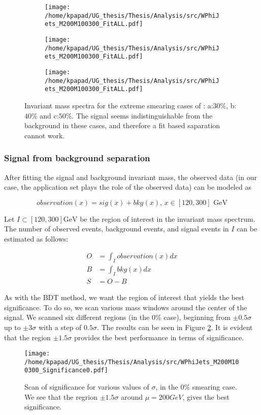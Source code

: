 \begin{figure}[htbp]
\centering
\begin{subfigure}{0.45\textwidth}
\centering
\texttt{[image: /home/kpapad/UG\_thesis/Thesis/Analysis/src/WPhiJets\_M200M100300\_FitALL.pdf]}
\caption{}
\end{subfigure}
\begin{subfigure}{0.45\textwidth}
\centering
\texttt{[image: /home/kpapad/UG\_thesis/Thesis/Analysis/src/WPhiJets\_M200M100300\_FitALL.pdf]}
\caption{}
\end{subfigure}

\begin{subfigure}{0.45\textwidth}
\centering
\texttt{[image: /home/kpapad/UG\_thesis/Thesis/Analysis/src/WPhiJets\_M200M100300\_FitALL.pdf]}
\caption{}
\end{subfigure}
\caption{Invariant mass spectra for the extreme smearing cases of : a:$30\%$, b:$40\%$ and c:$50\%$. The signal seems indistinguishable from the background in these cases, and therefore a fit based saparation cannot work.}
\label{fig:extremeSmearings}
\end{figure}
\subsubsection{Signal from background separation}
\label{sec:orgf26d5e2}
After fitting the signal and background invariant mass, the observed data (in our case, the application set plays the role of the observed data) can be modeled as

\begin{equation}
observation(x) = sig(x) + bkg(x)\text{, }x\in [120, 300] \text{ GeV}
\end{equation}

Let \(I\subset [120, 300]\text{GeV}\) be the region of interest in the invariant mass spectrum. The number of observed events, background events, and signal events in \(I\) can be estimated as follows:

\begin{align}
O &= \int_{I} observation(x) dx \\
B &= \int_{I} bkg(x) dx\\
S &= O - B
\end{align}

As with the BDT method, we want the region of interest that yields the best significance. To do so, we scan various mass windows around the center of the signal. We scanned six different regions (in the \(0\%\) case), beginning from \(\pm 0.5\sigma\) up to \(\pm 3\sigma\) with a step of \(0.5\sigma\). The results can be seen in Figure \ref{fig:Scan0}. It is evident that the region \(\pm 1.5\sigma\) provides the best performance in terms of significance.
\begin{figure}[h]
\centering
\texttt{[image: /home/kpapad/UG\_thesis/Thesis/Analysis/src/WPhiJets\_M200M100300\_Significance0.pdf]}
\caption{Scan of significance for various values of $\sigma$, in the $0\%$ smearing case. We see that the regrion $\pm 1.5\sigma$ around $\mu=200GeV$, gives the best significance.}
\label{fig:Scan0}
\end{figure}

